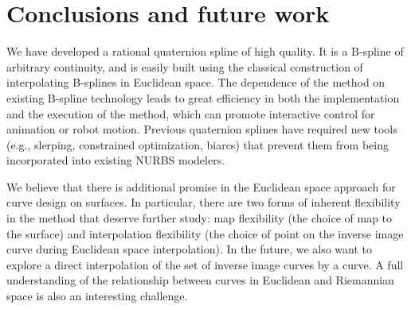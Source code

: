\section{Conclusions and future work}
\label{sec:conclusions}

We have developed a rational quaternion spline of high quality.
It is a B-spline of arbitrary continuity, and is easily built
using the classical construction of interpolating B-splines in Euclidean space.
The dependence of the method on existing B-spline technology leads to
great efficiency in both the implementation and the execution of the
method, which can promote interactive control for animation or robot motion.
Previous quaternion splines have required new tools (e.g., slerping,
constrained optimization, biarcs) that prevent them from being
incorporated into existing NURBS modelers.

We believe that there is additional promise in the Euclidean space approach
for curve design on surfaces.
In particular, there are two forms of inherent flexibility in the method
that deserve further study:
map flexibility (the choice of map to the surface)
and interpolation flexibility (the choice of point on the inverse image curve
during Euclidean space interpolation).
In the future, we also want to explore a direct interpolation of the set
of inverse image curves by a curve.
A full understanding of the relationship between curves in Euclidean
and Riemannian space is also an interesting challenge.

